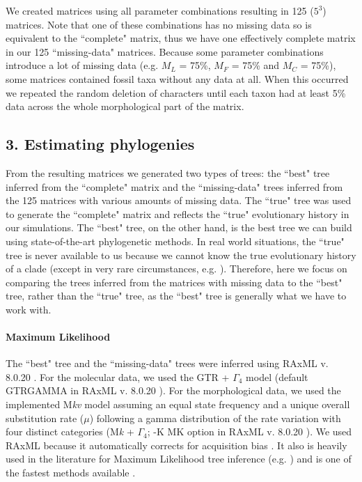 \documentclass[10pt,letterpaper]{article}
\begin{document}
We created matrices using all parameter combinations resulting in 125 ($5^3$) matrices. Note that one of these combinations has no missing data so is equivalent to the ``complete" matrix, thus we have one effectively complete matrix in our 125 ``missing-data" matrices. Because some parameter combinations introduce a lot of missing data (e.g. $M_L$ = 75\%, $M_F$ = 75\% and $M_C$ = 75\%), some matrices contained fossil taxa without any data at all. When this occurred we repeated the random deletion of characters until each taxon had at least 5\% data across the whole morphological part of the matrix.


\subsection*{3. Estimating phylogenies}
From the resulting matrices we generated two types of trees: the ``best" tree inferred from the ``complete" matrix and the ``missing-data" trees inferred from the 125 matrices with various amounts of missing data. The ``true" tree was used to generate the ``complete" matrix and reflects the ``true" evolutionary history in our simulations. The ``best" tree, on the other hand, is the best tree we can build using state-of-the-art phylogenetic methods. In real world situations, the ``true" tree is never available to us because we cannot know the true evolutionary history of a clade (except in very rare circumstances, e.g. \cite{rozen2005}). Therefore, here we focus on comparing the trees inferred from the matrices with missing data to the ``best" tree, rather than the ``true" tree, as the ``best" tree is generally what we have to work with.

\paragraph*{Maximum Likelihood}
The ``best" tree and the ``missing-data" trees were inferred using RAxML v. 8.0.20 \cite{Stamatakis21012014}. For the molecular data, we used the GTR + $\Gamma_4$ model \cite{tavare1986} (default GTRGAMMA in RAxML v. 8.0.20  \cite{Stamatakis21012014}). For the morphological data, we used the implemented M\textit{kv} model \cite{lewisa2001} assuming an equal state frequency and a unique overall substitution rate ($\mu$) following a gamma distribution of the rate variation with four distinct categories (M\textit{k} + $\Gamma_4$; -K MK option in RAxML v. 8.0.20 \cite{Stamatakis21012014}). We used RAxML because it automatically corrects for acquisition bias \cite{lewisa2001}. It also is heavily used in the literature for Maximum Likelihood tree inference (e.g. \cite{rouresite-specific2011,Bogdanowicz2012,springermacroevolutionary2012,O'Leary08022013,kellymolecular2014}) and is one of the fastest methods available \cite{Stamatakis01102008}. 
\end{document}
